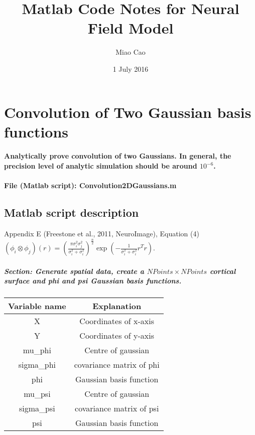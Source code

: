 \documentclass[a4paper, 8pt, english]{article}
\title{Matlab Code Notes for Neural Field Model}
\author{Miao Cao}
\date{1 July 2016}
\begin{document}
\begin{titlepage}\centering
\vspace*{\fill}
\maketitle
\vspace*{\fill}
\end{titlepage}

\tableofcontents

\newpage


\section{Convolution of Two Gaussian basis functions}

\paragraph{Analytically prove convolution of two Gaussians. In general, the
precision level of analytic simulation should be around $10^{-6}$.}

\paragraph{File (Matlab script): Convolution2DGaussians.m}

\subsection*{Matlab script description}

Appendix E (Freestone et al., 2011, NeuroImage), Equation (4) $\left(\phi_{i}\otimes\phi_{j}\right)(r)=(\frac{\pi\sigma_{i}^{2}\sigma_{j}^{2}}{\sigma_{i}^{2}+\sigma_{i}^{2}})^{\frac{n}{2}}\exp(-\frac{1}{\sigma_{i}^{2}+\sigma_{i}^{2}}r^{T}r)$.

\subparagraph{Section: Generate spatial data, create a $NPoints\times NPoints$ cortical surface and phi and psi Gaussian basis functions.\\}


\begin{tabular}{|c|c|}
\hline
Variable name & Explanation\tabularnewline
\hline
X & Coordinates of x-axis\tabularnewline
\hline
Y & Coordinates of y-axis\tabularnewline
\hline
mu\_phi & Centre of gaussian\tabularnewline
\hline
sigma\_phi & covariance matrix of phi\tabularnewline
\hline
phi & Gaussian basis function\tabularnewline
\hline
mu\_psi & Centre of gaussian\tabularnewline
\hline
sigma\_psi & covariance matrix of psi\tabularnewline
\hline
psi & Gaussian basis function\tabularnewline
\hline
\end{tabular}
\end{document}
